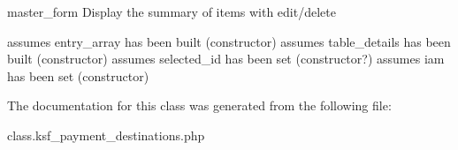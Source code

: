 master\+\_\+form Display the summary of items with edit/delete

assumes entry\+\_\+array has been built (constructor) assumes table\+\_\+details has been built (constructor) assumes selected\+\_\+id has been set (constructor?) assumes iam has been set (constructor) 

The documentation for this class was generated from the following file\+:\begin{DoxyCompactItemize}
\item 
class.\+ksf\+\_\+payment\+\_\+destinations.\+php\end{DoxyCompactItemize}
